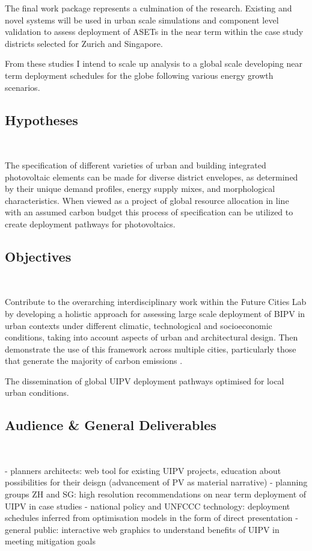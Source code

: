 The final work package represents a culmination of the research. Existing and novel systems will be used in urban scale simulations and component level validation to assess deployment of ASETs in the near term within the case study districts selected for Zurich and Singapore. 

From these studies I intend to scale up analysis to a global scale developing near term deployment schedules for the globe following various energy growth scenarios.

\subsection{Hypotheses}\

The specification of different varieties of urban and building integrated photovoltaic elements can be made for diverse district envelopes, as determined by their unique demand profiles, energy supply mixes, and morphological characteristics. When viewed as a project of global resource allocation in line with an assumed carbon budget this process of specification can be utilized to create deployment pathways for photovoltaics.


\subsection{Objectives}\

Contribute to the overarching interdisciplinary work within the Future Cities Lab by developing a holistic approach for assessing large scale deployment of BIPV in urban contexts under different climatic, technological and socioeconomic conditions, taking into account aspects of urban and architectural design. Then demonstrate the use of this framework across multiple cities, particularly those that generate the majority of carbon emissions \cite{wei et al, moran et al}.

The dissemination of global UIPV deployment pathways optimised for local urban conditions.




\subsection{Audience \& General Deliverables}\

- planners architects: web tool for existing UIPV projects, education about possibilities for their deisgn (advancement of PV as material narrative)
- planning groups ZH and SG: high resolution recommendations on near term deployment of UIPV in case studies
- national policy and UNFCCC technology: deployment schedules inferred from optimisation models in the form of direct presentation
- general public: interactive web graphics to understand benefits of UIPV in meeting mitigation goals


